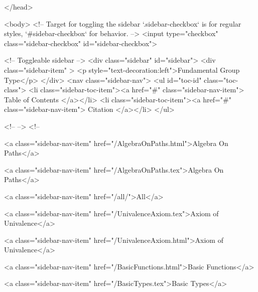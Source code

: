   
</head>




  <body>
    <!-- Target for toggling the sidebar `.sidebar-checkbox` is for regular
     styles, `#sidebar-checkbox` for behavior. -->
<input type="checkbox" class="sidebar-checkbox" id="sidebar-checkbox">

<!-- Toggleable sidebar -->
<div class="sidebar" id="sidebar">
  <div class="sidebar-item" >
    <p style="text-decoration:left">Fundamental Group Type</p>
  </div>
  <nav class="sidebar-nav">
    <ul id="toc-id" class="toc-class">
  <li class="sidebar-toc-item"><a href="#" class="sidebar-nav-item"> Table of Contents </a></li>
  <li class="sidebar-toc-item"><a href="#" class="sidebar-nav-item"> Citation </a></li>
</ul>


    <!--  -->
    <!-- 
      
    
      
    
      
    
      
        
      
    
      
        
          <a class="sidebar-nav-item" href="/AlgebraOnPaths.html">Algebra On Paths</a>
        
      
    
      
        
          <a class="sidebar-nav-item" href="/AlgebraOnPaths.tex">Algebra On Paths</a>
        
      
    
      
        
          <a class="sidebar-nav-item" href="/all/">All</a>
        
      
    
      
        
          <a class="sidebar-nav-item" href="/UnivalenceAxiom.tex">Axiom of Univalence</a>
        
      
    
      
        
          <a class="sidebar-nav-item" href="/UnivalenceAxiom.html">Axiom of Univalence</a>
        
      
    
      
        
          <a class="sidebar-nav-item" href="/BasicFunctions.html">Basic Functions</a>
        
      
    
      
        
          <a class="sidebar-nav-item" href="/BasicTypes.tex">Basic Types</a>
        
